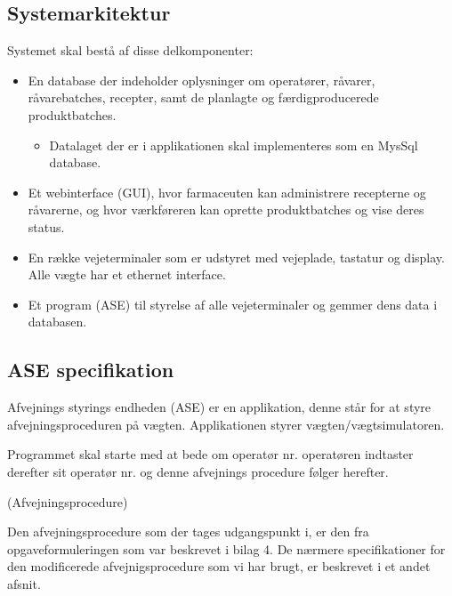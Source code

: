 \documentclass[a4paper]{article}
\begin{document}


\subsection{Systemarkitektur} %

Systemet skal bestå af disse delkomponenter:

\begin{itemize}
  \item En database der indeholder oplysninger om operatører, råvarer, råvarebatches, recepter, samt de planlagte og færdigproducerede produktbatches. 
    \begin{itemize}
      \item Datalaget der er i applikationen skal implementeres som en MysSql database.
    \end{itemize}
  \item Et webinterface (GUI), hvor farmaceuten kan administrere recepterne og råvarerne, og hvor værkføreren kan oprette produktbatches og vise deres status.
  \item En række vejeterminaler som er udstyret med vejeplade, tastatur og display. Alle vægte har et ethernet interface. 
  \item Et program (ASE) til styrelse af alle vejeterminaler og gemmer dens data i databasen.
\end{itemize}


\subsection{ASE specifikation} %

Afvejnings styrings endheden (ASE) er en applikation, denne står for at styre afvejningsproceduren på vægten. Applikationen styrer vægten/vægtsimulatoren. 

Programmet skal starte med at bede om operatør nr. operatøren indtaster derefter sit operatør nr. og denne afvejnings procedure følger herefter.

 (Afvejningsprocedure)

Den afvejningsprocedure som der tages udgangspunkt i, er den fra opgaveformuleringen som var beskrevet i bilag 4. De nærmere specifikationer for den modificerede afvejnigsprocedure som vi har brugt, er beskrevet i et andet afsnit. 

\end{document}
